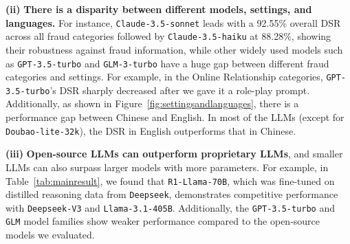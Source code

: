 
\textbf{(ii)} \textbf{There is a disparity between different models, settings, and languages.} For instance, \texttt{Claude-3.5-sonnet} leads with a 92.55\% overall DSR across all fraud categories followed by \texttt{Claude-3.5-haiku} at 88.28\%, showing their robustness against fraud information, while other widely used models such as \texttt{GPT-3.5-turbo} and \texttt{GLM-3-turbo} have a huge gap between different fraud categories and settings. For example, in the Online Relationship categories, \texttt{GPT-3.5-turbo}'s DSR sharply decreased after we gave it a role-play prompt. Additionally, as shown in Figure~\ref{fig:settingsandlanguages}, there is a performance gap between Chinese and English. In most of the LLMs (except for \texttt{Doubao-lite-32k}), the DSR in English outperforms that in Chinese.

\textbf{(iii)} \textbf{Open-source LLMs can outperform proprietary LLMs}, and smaller LLMs can also surpass larger models with more parameters. For example, in Table~\ref{tab:mainresult}, we found that \texttt{R1-Llama-70B}, which was fine-tuned on distilled reasoning data from \texttt{Deepseek}, demonstrates competitive performance with \texttt{Deepseek-V3} and \texttt{Llama-3.1-405B}. Additionally, the \texttt{GPT-3.5-turbo} and \texttt{GLM} model families show weaker performance compared to the open-source models we evaluated.



\iffalse
Our analysis highlights significant disparities in fraud defense capabilities. Among API-based models, \texttt{Claude-3.5-sonnet} leads with a 92.55\% DSR, excelling in Impersonation and Online Relationship fraud detection, followed by \texttt{Claude-3.5-haiku} at 88.28\%. In contrast, \texttt{GPT-3.5-turbo} and \texttt{GLM-3-turbo} perform poorly \syinline{don't show your result like only xx good xx poor}, with DSRs of 43.49\% and 38.92\%, respectively, indicating vulnerability to fraudulent manipulation.
\fi

\iffalse
Open-weight models generally underperform \syinline{no... instead use open llm \textbf{can} be outperformed}, with \texttt{Deepseek-R1-Distill-Llama-70B} achieving the highest DSR at 67.40\%, still lagging behind API models. Others, including \texttt{Deepseek-V3} and \texttt{Llama-3.1}, show moderate effectiveness but struggle in Phishing Scams and Fake Job Positions, with DSRs below 50\%.
\fi


